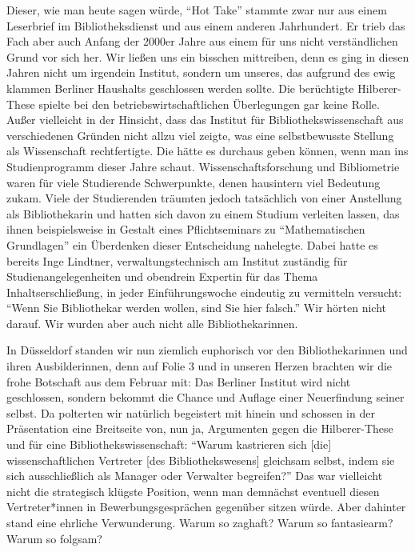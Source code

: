 \documentclass[output=paper]{langsci/langscibook}
\begin{document}
Dieser, wie man heute sagen würde, \enquote{Hot Take} stammte zwar nur
aus einem Leserbrief im Bibliotheksdienst und aus einem anderen
Jahrhundert. Er trieb das Fach aber auch Anfang der 2000er Jahre aus
einem für uns nicht verständlichen Grund vor sich her. Wir ließen uns
ein bisschen mittreiben, denn es ging in diesen Jahren nicht um
irgendein Institut, sondern um unseres, das aufgrund des ewig klammen
Berliner Haushalts geschlossen werden sollte. Die berüchtigte
Hilberer-These spielte bei den betriebswirtschaftlichen Überlegungen gar
keine Rolle. Außer vielleicht in der Hinsicht, dass das Institut für
Bibliothekswissenschaft aus verschiedenen Gründen nicht allzu viel
zeigte, was eine selbstbewusste Stellung als Wissenschaft rechtfertigte.
Die hätte es durchaus geben können, wenn man ins Studienprogramm dieser
Jahre schaut. Wissenschaftsforschung und Bibliometrie waren für viele
Studierende Schwerpunkte, denen hausintern viel Bedeutung zukam. Viele
der Studierenden träumten jedoch tatsächlich von einer Anstellung als
Bibliothekarin und hatten sich davon zu einem Studium verleiten lassen,
das ihnen beispielsweise in Gestalt eines Pflichtseminars zu
\enquote{Mathematischen Grundlagen} ein Überdenken dieser Entscheidung
nahelegte. Dabei hatte es bereits Inge Lindtner, verwaltungstechnisch am
Institut zuständig für Studienangelegenheiten und obendrein Expertin für
das Thema Inhaltserschließung, in jeder Einführungswoche eindeutig zu
vermitteln versucht: \enquote{Wenn Sie Bibliothekar werden wollen, sind
Sie hier falsch.} Wir hörten nicht darauf. Wir wurden aber auch nicht
alle Bibliothekarinnen.

In Düsseldorf standen wir nun ziemlich euphorisch vor den
Bibliothekarinnen und ihren Ausbilderinnen, denn auf Folie 3 und in
unseren Herzen brachten wir die frohe Botschaft aus dem Februar mit: Das
Berliner Institut wird nicht geschlossen, sondern bekommt die Chance und
Auflage einer Neuerfindung seiner selbst. Da polterten wir natürlich
begeistert mit hinein und schossen in der Präsentation eine Breitseite
von, nun ja, Argumenten gegen die Hilberer-These und für eine
Bibliothekswissenschaft: \enquote{Warum kastrieren sich {[}die{]}
wissenschaftlichen Vertreter {[}des Bibliothekswesens{]} gleichsam
selbst, indem sie sich ausschließlich als Manager oder Verwalter
begreifen?} Das war vielleicht nicht die strategisch klügste Position,
wenn man demnächst eventuell diesen Vertreter*innen in
Bewerbungsgesprächen gegenüber sitzen würde. Aber dahinter stand eine
ehrliche Verwunderung. Warum so zaghaft? Warum so fantasiearm? Warum so
folgsam?
\end{document}
